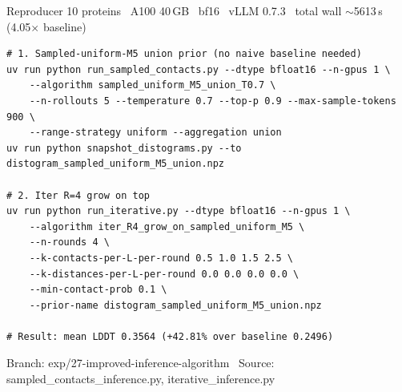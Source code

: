 \documentclass[aspectratio=169,11pt]{beamer}
\begin{document}
\begin{frame}[fragile]{Reproducer}
  \scriptsize 10 proteins \textperiodcentered\ A100 40\,GB \textperiodcentered\ bf16
  \textperiodcentered\ vLLM 0.7.3 \textperiodcentered\
  total wall $\sim$5613\,s (4.05$\times$ baseline)
  \vspace{0.2em}
  \begin{lstlisting}[style=code,basicstyle=\ttfamily\scriptsize\color{navy}]
# 1. Sampled-uniform-M5 union prior (no naive baseline needed)
uv run python run_sampled_contacts.py --dtype bfloat16 --n-gpus 1 \
    --algorithm sampled_uniform_M5_union_T0.7 \
    --n-rollouts 5 --temperature 0.7 --top-p 0.9 --max-sample-tokens 900 \
    --range-strategy uniform --aggregation union
uv run python snapshot_distograms.py --to distogram_sampled_uniform_M5_union.npz

# 2. Iter R=4 grow on top
uv run python run_iterative.py --dtype bfloat16 --n-gpus 1 \
    --algorithm iter_R4_grow_on_sampled_uniform_M5 \
    --n-rounds 4 \
    --k-contacts-per-L-per-round 0.5 1.0 1.5 2.5 \
    --k-distances-per-L-per-round 0.0 0.0 0.0 0.0 \
    --min-contact-prob 0.1 \
    --prior-name distogram_sampled_uniform_M5_union.npz

# Result: mean LDDT 0.3564 (+42.81% over baseline 0.2496)
  \end{lstlisting}
  {\tiny\color{grey}\ttfamily Branch: exp/27-improved-inference-algorithm \textperiodcentered\
    Source: sampled\_contacts\_inference.py, iterative\_inference.py}
\end{frame}
\end{document}
